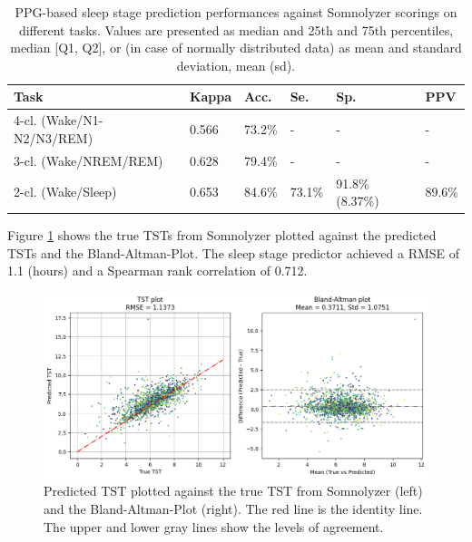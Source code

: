 \renewcommand{\arraystretch}{1.5}
\begin{table}[h!]
    \centering
    \begin{tabular}{ p{2.5cm} p{2cm} p{2.3cm} p{2.3cm} p{1.5cm} p{2.3cm} }
        Task & Kappa & Acc. & Se. & Sp. & PPV \\
        \hline
        4-cl. \newline (Wake/N1-\newline N2/N3/REM) & 0.566 \newline [0.436, 0.677] & 73.2\%\newline [64.8\%, 80.0\%] & - & - & - \\
        3-cl. \newline (Wake/NREM\newline/REM) & 0.628 \newline [0.473, 0.740] & 79.4\%\newline [70.8\%, 85.6\%] & - & - & - \\
        2-cl. \newline (Wake/Sleep) & 0.653 \newline [0.475, 0.778] & 84.6\% \newline [76.2\%, 90.3\%] & 73.1\% \newline [56.9\%, 84.9\%] & 91.8\% \newline (8.37\%) & 89.6\% \newline [79.0\%, 95.2\%] \\
    \end{tabular}
    \caption{PPG-based sleep stage prediction performances against Somnolyzer scorings on different tasks. Values are presented as median and 25th and 75th percentiles, median [Q1, Q2], or (in case of normally distributed data) as mean and standard deviation, mean (sd). \label{tab:predicted-hypnogram-results}}
\end{table}

Figure \ref{fig:tst-plot} shows the true TSTs from Somnolyzer plotted against the predicted TSTs and the Bland-Altman-Plot. The sleep stage predictor achieved a RMSE of 1.1 (hours) and a Spearman rank correlation of 0.712.

\begin{figure}
    \centering
    \includegraphics[width=\textwidth]{images/TstPlot}
    \caption{Predicted TST plotted against the true TST from Somnolyzer (left) and the Bland-Altman-Plot (right). The red line is the identity line. The upper and lower gray lines show the levels of agreement.}
    \label{fig:tst-plot}
\end{figure}

